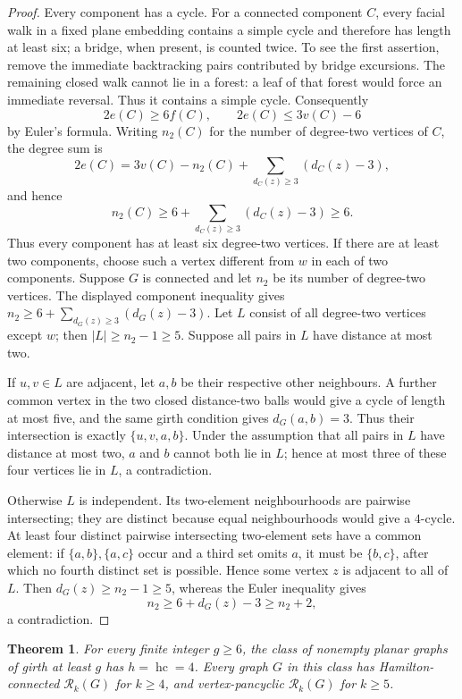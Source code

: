\documentclass[11pt]{article}
\newtheorem{theorem}{Theorem}[section]
\theoremstyle{remark}
\newcommand{\Rk}{\mathcal R_k}
\newcommand{\hc}{\operatorname{hc}}
\numberwithin{equation}{section}
\numberwithin{table}{section}
\begin{document}
\begin{proof}
Every component has a cycle.  For a connected component $C$, every
facial walk in a fixed plane embedding contains a simple cycle and
therefore has length at least six; a bridge, when present, is counted
twice.  To see the first assertion, remove the immediate backtracking
pairs contributed by bridge excursions.  The remaining closed walk cannot
lie in a forest: a leaf of that forest would force an immediate reversal.
Thus it contains a simple cycle.  Consequently
\[
  2e(C)\ge6f(C),\qquad 2e(C)\le3v(C)-6
\]
by Euler's formula.  Writing $n_2(C)$ for the number of degree-two
vertices of $C$, the degree sum is
\[
  2e(C)=3v(C)-n_2(C)
       +\sum_{d_C(z)\ge3}(d_C(z)-3),
\]
and hence
\[
 n_2(C)\ge6+\sum_{d_C(z)\ge3}(d_C(z)-3)\ge6.
\]
Thus every component has at least six degree-two vertices.  If there are
at least two components, choose such a vertex different from $w$ in each
of two components.  Suppose $G$ is connected and let $n_2$ be its number
of degree-two vertices.  The displayed component inequality gives
$n_2\ge6+\sum_{d_G(z)\ge3}(d_G(z)-3)$.
Let $L$ consist of all degree-two vertices except $w$; then
$|L|\ge n_2-1\ge5$.  Suppose all pairs in $L$ have distance at
most two.

If $u,v\in L$ are adjacent, let $a,b$ be their respective other
neighbours.  A further common vertex in the two closed distance-two
balls would give a cycle of length at most five, and the same girth
condition gives $d_G(a,b)=3$.  Thus their intersection is exactly
$\{u,v,a,b\}$.  Under the assumption that all pairs in $L$ have
distance at most two, $a$ and $b$ cannot both lie in $L$; hence at most
three of these four vertices lie in $L$, a contradiction.

Otherwise $L$ is independent.  Its two-element neighbourhoods are
pairwise intersecting; they are distinct because equal neighbourhoods
would give a $4$-cycle.
At least four distinct pairwise intersecting two-element sets have a
common element: if $\{a,b\},\{a,c\}$ occur and a third set omits
$a$, it must be $\{b,c\}$, after which no fourth distinct set is
possible.  Hence some vertex $z$ is adjacent to all of $L$.
Then $d_G(z)\ge n_2-1\ge5$, whereas the Euler inequality gives
\[
 n_2\ge6+d_G(z)-3\ge n_2+2,
\]
a contradiction.
\end{proof}

\begin{theorem}
\label{thm:girth6-hc}
For every finite integer $g\ge6$, the class of nonempty planar graphs
of girth at least $g$ has $h=\hc=4$.  Every graph $G$ in this
class has Hamilton-connected $\Rk(G)$ for $k\ge4$, and
vertex-pancyclic $\Rk(G)$ for $k\ge5$.
\end{theorem}
\end{document}
